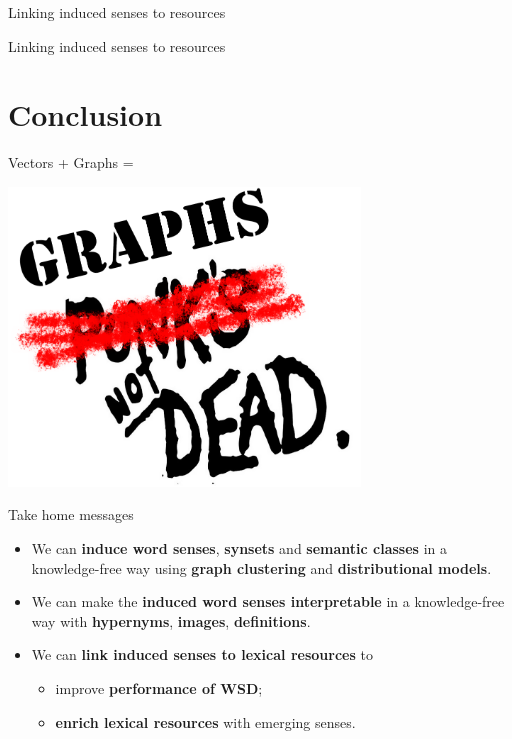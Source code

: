 \documentclass[usenames,dvipsnames]{beamer}
\begin{document}
\begin{frame}{ Linking induced senses to resources }
	
\end{frame}


\begin{frame}{ Linking induced senses to resources }
	
\end{frame}


\section{Conclusion}


\begin{frame}{Vectors + Graphs = \heartsuit }

\begin{center}
\includegraphics[width=0.7\textwidth]{graphs}	
\end{center}


\end{frame}

\begin{frame}{Take home messages}

\begin{itemize}
	\item We can \alert{\textbf{induce word senses}}, \alert{\textbf{synsets}} and \alert{\textbf{semantic classes}} in a knowledge-free way using \textbf{graph clustering} and \textbf{distributional models}.
    \vspace{1em}
    \pause
    
	\item We can make the \alert{\textbf{induced word senses interpretable}} in a knowledge-free way with \textbf{hypernyms}, \textbf{images},  \textbf{definitions}. 
	\vspace{1em}
    \pause
	
	\item We can \alert{\textbf{link induced senses to lexical resources}} to
	\begin{itemize} 
		\item improve \textbf{performance of WSD};
		\item \textbf{enrich lexical resources} with emerging senses.
	\end{itemize}
	
\end{itemize}


\end{frame}
\end{document}
